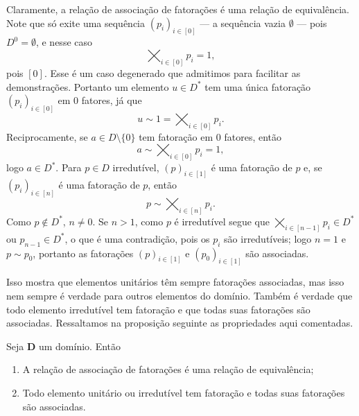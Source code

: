 
Claramente, a relação de associação de fatorações é uma relação de equivalência. Note que só exite uma sequência $(p_i)_{i \in [0]}$ --- a sequência vazia $\emptyset$ --- pois $D^0=\emptyset$, e nesse caso
	\begin{equation*}
	\bigtimes_{i \in [0]} p_i = 1,
	\end{equation*}
pois $[0]$. Esse é um caso degenerado que admitimos para facilitar as demonstrações. Portanto um elemento $u \in D^*$ tem uma única fatoração $(p_i)_{i \in [0]}$ em $0$ fatores, já que
	\begin{equation*}
	u \sim 1 = \bigtimes_{i \in [0]} p_i.
	\end{equation*}
Reciprocamente, se $a \in D\setminus\{0\}$ tem fatoração em $0$ fatores, então
	\begin{equation*}
	a \sim \bigtimes_{i \in [0]} p_i = 1,
	\end{equation*}
logo $a \in D^*$. Para $p \in D$ irredutível, $(p)_{i \in [1]}$ é uma fatoração de $p$ e, se $(p_i)_{i \in [n]}$ é uma fatoração de $p$, então
	\begin{equation*}
	p \sim \bigtimes_{i \in [n]} p_i.
	\end{equation*}
Como $p \notin D^*$, $n \neq 0$. Se $n>1$, como $p$ é irredutível segue que $\bigtimes_{i \in [n-1]} p_i \in D^*$ ou $p_{n-1} \in D^*$, o que é uma contradição, pois os $p_i$ são irredutíveis; logo $n=1$ e $p \sim p_0$, portanto as fatorações $(p)_{i \in [1]}$ e $(p_0)_{i \in [1]}$ são associadas.

Isso mostra que elementos unitários têm sempre fatorações associadas, mas isso nem sempre é verdade para outros elementos do domínio. Também é verdade que todo elemento irredutível tem fatoração e que todas suas fatorações são associadas. Ressaltamos na proposição seguinte as propriedades aqui comentadas.

\begin{prop}
Seja $\bm D$ um domínio. Então
	\begin{enumerate}
	\item A relação de associação de fatorações é uma relação de equivalência;
	\item Todo elemento unitário ou irredutível tem fatoração e todas suas fatorações são associadas.
	\end{enumerate}
\end{prop}


